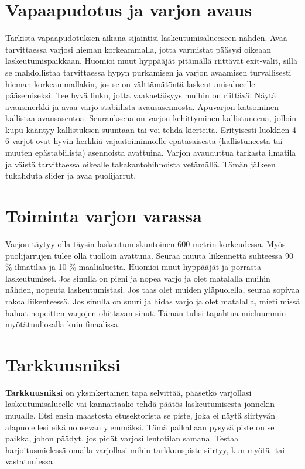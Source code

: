 \section{ Vapaapudotus ja varjon avaus }
\label{hyppytapahtuma-kuvunkasittelyhypyilla-vapaapudotus-ja-varjon-avaus}


Tarkista vapaapudotuksen aikana sijaintisi laskeutumisalueeseen nähden. Avaa tarvittaessa varjosi hieman korkeammalla, jotta varmistat pääsysi oikeaan laskeutumispaikkaan. Huomioi muut hyppääjät pitämällä riittävät exit-välit, sillä se mahdollistaa tarvittaessa hypyn purkamisen ja varjon avaamisen turvallisesti hieman korkeammallakin, jos se on välttämätöntä laskeutumisalueelle pääsemiseksi. Tee hyvä liuku, jotta vaakaetäisyys muihin on riittävä. Näytä avausmerkki ja avaa varjo stabiilista avausasennosta. Apuvarjon katsominen kallistaa avausasentoa. Seurauksena on varjon kehittyminen kallistuneena, jolloin kupu kääntyy kallistuksen suuntaan tai voi tehdä kierteitä. Erityisesti luokkien 4–6 varjot ovat hyvin herkkiä vajaatoiminnoille epätasaisesta (kallistuneesta tai muuten epästabiilista) asennoista avattuina. Varjon avauduttua tarkasta ilmatila ja väistä tarvittaessa oikealle takakantohihnoista vetämällä. Tämän jälkeen tukahduta slider ja avaa puolijarrut. 

\section{ Toiminta varjon varassa }
\label{hyppytapahtuma-kuvunkasittelyhypyilla-toiminta-varjon-varassa}


Varjon täytyy olla täysin laskeutumiskuntoinen 600 metrin korkeudessa. Myös puolijarrujen tulee olla tuolloin avattuna. Seuraa muuta liikennettä suhteessa 90 \% ilmatilaa ja 10 \% maalialuetta. Huomioi muut hyppääjät ja porrasta laskeutumiset. Jos sinulla on pieni ja nopea varjo ja olet matalalla muihin nähden, nopeuta laskeutumistasi. Jos taas olet muiden yläpuolella, seuraa sopivaa rakoa liikenteessä. Jos sinulla on suuri ja hidas varjo ja olet matalalla, mieti missä haluat nopeitten varjojen ohittavan sinut. Tämän tulisi tapahtua mieluummin myötätuuliosalla kuin finaalissa. 

\section{ Tarkkuusniksi }
\label{hyppytapahtuma-kuvunkasittelyhypyilla-tarkkuusniksi}


\textbf{Tarkkuusniksi} on yksinkertainen tapa selvittää, pääsetkö varjollasi laskeutumisalueelle vai kannattaako tehdä päätös laskeutumisesta jonnekin muualle. Etsi ensin maastosta etusektorista se piste, joka ei näytä siirtyvän alapuolellesi eikä nousevan ylemmäksi. Tämä paikallaan pysyvä piste on se paikka, johon päädyt, jos pidät varjosi lentotilan samana. Testaa harjoitusmielessä omalla varjollasi mihin tarkkuuspiste siirtyy, kun myötä- tai vastatuulessa  

